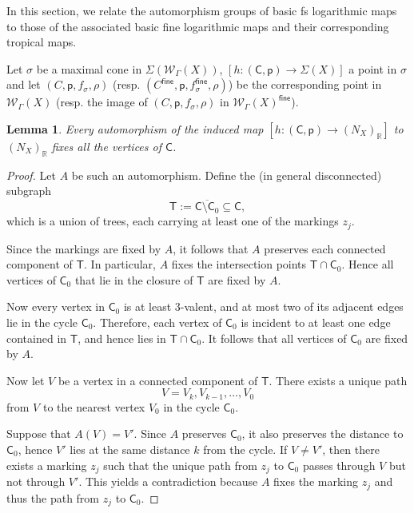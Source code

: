 \documentclass{article}
\def\cW{\mathcal{W}}
\def\R{\mathbb{R}}
\newtheorem{lemma}[definition]{Lemma}
\newcommand{\tropC}{\mathsf{C}}
\newcommand{\fine}{\mathsf{fine}}
\begin{document}
In this section, we relate the automorphism groups of basic fs logarithmic maps to those of the associated basic fine logarithmic maps and their corresponding tropical maps.

Let $\sigma$ be a maximal cone in $\Sigma(\mathcal{W}_\Gamma(X))$, $[h:(\mathsf{C},\mathsf{p}) \to \Sigma(X)]$ a point in $\sigma$ and let $(C,\mathsf{p}, f_\sigma,  \rho)$ (resp. $(C^\fine,\mathsf{p}, f_\sigma^\fine ,  \rho)$) be the corresponding point in $\mathcal{W}_\Gamma(X)$ (resp. the image of $(C,\mathsf{p}, f_\sigma,  \rho)$ in $\cW_\Gamma(X)^\fine$).



\begin{lemma}\label{lemma: automorphisms fix vertices}
Every automorphism of the induced map $[h:(\mathsf{C},\mathsf{p}) \to (N_X)_\R]$ to $(N_X)_\R$ fixes all the vertices of $\tropC$.
\end{lemma}

\begin{proof}
Let $A$ be such an automorphism. Define the (in general disconnected) subgraph
\[
\mathsf{T} := \overline{\tropC \setminus \tropC_0} \subseteq \tropC,
\]
which is a union of trees, each carrying at least one of the markings $z_j$.

Since the markings are fixed by $A$, it follows that $A$ preserves each connected component of $\mathsf{T}$. In particular, $A$ fixes the intersection points $\mathsf{T} \cap \tropC_0$. Hence all vertices of $\tropC_0$ that lie in the closure of $\mathsf{T}$ are fixed by $A$.

Now every vertex in $\tropC_0$ is at least $3$-valent, and at most two of its adjacent edges lie in the cycle $\tropC_0$. Therefore, each vertex of $\tropC_0$ is incident to at least one edge contained in $\mathsf{T}$, and hence lies in $\mathsf{T} \cap \tropC_0$. It follows that all vertices of $\tropC_0$ are fixed by $A$.


Now let $V$ be a vertex in a connected component of $\mathsf{T}$. There exists a unique path
\[
V = V_k, V_{k-1}, \dots, V_0
\]
from $V$ to the nearest vertex $V_0$ in the cycle $\tropC_0$.

Suppose that $A(V) = V'$. Since $A$ preserves $\tropC_0$, it also preserves the distance to $\tropC_0$, hence $V'$ lies at the same distance $k$ from the cycle. If $V \neq V'$, then there exists a marking $z_j$ such that the unique path from $z_j$ to $\tropC_0$ passes through $V$ but not through $V'$. This yields a contradiction because $A$ fixes the marking $z_j$ and thus the path from $z_j$ to $\tropC_0$.

\end{proof}
\end{document}
